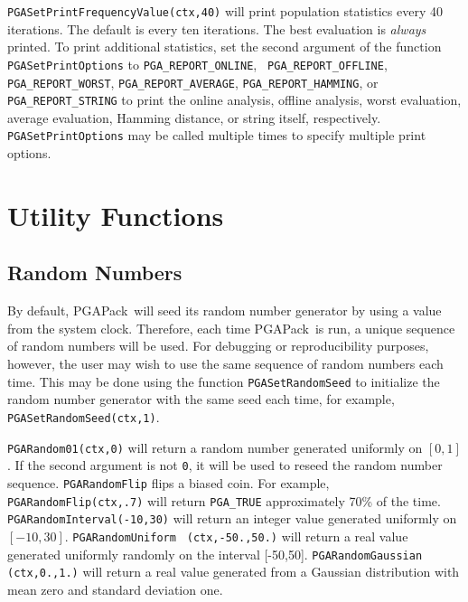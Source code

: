 \documentclass{report}
\newcommand{\pga}{PGAPack}
\begin{document}
\begin{sloppypar}
{\tt PGASetPrintFrequencyValue(ctx,40)} will print population statistics every
40 iterations.  The default is every ten iterations.  The best evaluation is
{\em always} printed.  To print additional statistics, set the second argument
of the function {\tt PGASetPrintOptions} to {\tt PGA\_REPORT\_ONLINE}, {\tt
PGA\_REPORT\_OFFLINE}, {\tt PGA\_REPORT\_WORST}, {\tt PGA\_REPORT\_AVERAGE},
{\tt PGA\_REPORT\_HAMMING}, or {\tt PGA\_REPORT\_STRING} to print the online
analysis, offline analysis, worst evaluation, average evaluation, Hamming
distance, or string itself, respectively.  {\tt PGASetPrintOptions} may be
called multiple times to specify multiple print options.
\end{sloppypar}


\section{Utility Functions}\label{sec:utility}

\subsection{Random Numbers}\label{subsec:random}

By default, \pga\ will seed its random number generator by using a value from the
system clock.  Therefore, each time \pga\ is run, a unique sequence of random
numbers will be used.  For debugging or reproducibility purposes, however, the
user may wish to use the same sequence of random numbers each time.  This may
be done using the function {\tt PGASetRandomSeed} to initialize the random
number generator with the same seed each time, for example, {\tt
PGASetRandomSeed(ctx,1)}.

\begin{sloppypar}
{\tt PGARandom01(ctx,0)} will return a random number generated uniformly on
$[0,1]$.  If the second argument is not {\tt 0}, it will be used to reseed the
random number sequence. {\tt PGARandomFlip} flips a biased coin.  For example,
{\tt PGARandomFlip(ctx,.7)} will return {\tt PGA\_TRUE} approximately 70\% of
the time.  {\tt PGARandomInterval(-10,30)} will return an integer value
generated uniformly on $[-10,30]$.  {\tt PGARandomUniform} {\tt
(ctx,-50.,50.)} will return a real value generated uniformly randomly on the
interval [-50,50].  {\tt PGARandomGaussian} {\tt (ctx,0.,1.)} will return a
real value generated from a Gaussian distribution with mean zero and standard
deviation one.
\end{sloppypar}
\end{document}
